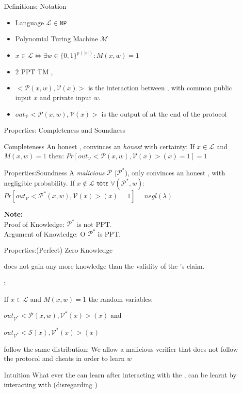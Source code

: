 \documentclass[handout]{beamer}
\begin{document}
\begin{frame}{Definitions: Notation}

\begin{itemize}
\item Language $ \mathcal{L} \in \mathtt{NP}$ \pause
\item Polynomial Turing Machine $\mathcal{M}$ \pause
\item $x \in \mathcal{L} \Leftrightarrow \exists w \in \{0,1\}^{p(|x|)}: M(x,w) = 1$ \pause
\item 2 PPT TM \prv, \ver \pause
\item $<\mathcal{P}(x,w), \mathcal{V}(x)>$ is the interaction between  \prv, \ver with common public input $x$ and private \prv input $w$. \pause
\item $out_\mathcal{V}{<\mathcal{P}(x,w), \mathcal{V}(x)>}$ is the output of \ver at the end of the protocol
\end{itemize}
\end{frame}


\begin{frame}{Properties: Completeness and Soundness}
\begin{block}{Completeness}
An honest \prv, convinces an \emph{honest} \ver with certainty:
If  $x \in \mathcal{L}$ and $M(x,w) = 1$ then:
$ Pr[out_{\mathcal{V}}<\mathcal{P}(x,w), \mathcal{V}(x)>(x)=1] = 1  $
\end{block}
\pause
\begin{block}{Properties:Soundness}
A \emph{malicious} $\mathcal{P}$ ($\mathcal{P}^*$),  only convinces an honest \ver, with negligible probability.
If $x \notin \mathcal{L}$ τότε $\forall (\mathcal{P}^*,w)$: 
$ Pr[out_{\mathcal{V}}<\mathcal{P}^*(x,w), \mathcal{V}(x)>(x)=1] = negl(\lambda) $ 
\end{block}
\pause
\textbf{Note: }\\
Proof of Knowledge: $\mathcal{P}^*$ is \alert{not} PPT. \\
Argument of Knowledge: O $\mathcal{P}^*$  is PPT.
\end{frame}

\begin{frame}{Properties:(Perfect) Zero Knowledge}

\ver does not gain any more knowledge than the validity of the \prv's claim. \pause
 
 : \pause

If  $x \in \mathcal{L}$ and $M(x,w) = 1$ the random variables:

$ out_{\mathcal{V}^*}<\mathcal{P}(x,w), \mathcal{V}^*(x)>(x) $ and  

$ out_{\mathcal{V}^*}<\mathcal{S}(x), \mathcal{V}^*(x)>(x) $ 

follow the same distribution:
\pause
We allow a \alert{malicious verifier} that does not follow the protocol and cheats in order to learn $w$
\pause
\begin{block}{Intuition}
What ever the \ver can learn after interacting with the \prv, can be learnt by interacting with \siml (disregarding \prv)

\end{block}
\end{frame}
\end{document}
